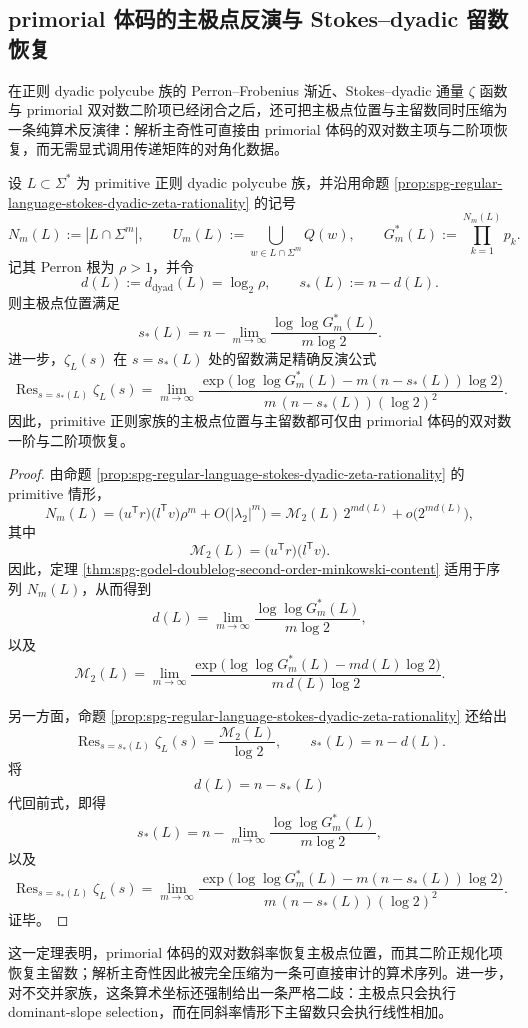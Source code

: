 \subsection{primorial 体码的主极点反演与 Stokes--dyadic 留数恢复}\label{subsec:conclusion-primorial-bodycode-pole-residue-inversion}
在正则 dyadic polycube 族的 Perron--Frobenius 渐近、Stokes--dyadic 通量 \(\zeta\) 函数与 primorial 双对数二阶项已经闭合之后，还可把主极点位置与主留数同时压缩为一条纯算术反演律：解析主奇性可直接由 primorial 体码的双对数主项与二阶项恢复，而无需显式调用传递矩阵的对角化数据。

\begin{theorem}\label{thm:conclusion-primorial-bodycode-pole-residue-inversion}
设 \(L\subset \Sigma^\ast\) 为 primitive 正则 dyadic polycube 族，并沿用命题 \ref{prop:spg-regular-language-stokes-dyadic-zeta-rationality} 的记号
\[
N_m(L):=|L\cap \Sigma^m|,
\qquad
U_m(L):=\bigcup_{w\in L\cap \Sigma^m}Q(w),
\qquad
G_m^\ast(L):=\prod_{k=1}^{N_m(L)}p_k.
\]
记其 Perron 根为 \(\rho>1\)，并令
\[
d(L):=d_{\mathrm{dyad}}(L)=\log_2\rho,
\qquad
s_\ast(L):=n-d(L).
\]
则主极点位置满足
\[
s_\ast(L)
=
n-\lim_{m\to\infty}\frac{\log\log G_m^\ast(L)}{m\log 2}.
\]
进一步，\(\zeta_L(s)\) 在 \(s=s_\ast(L)\) 处的留数满足精确反演公式
\[
\operatorname{Res}_{s=s_\ast(L)}\zeta_L(s)
=
\lim_{m\to\infty}
\frac{
\exp\!\bigl(\log\log G_m^\ast(L)-m(n-s_\ast(L))\log 2\bigr)
}
{m\,(n-s_\ast(L))(\log 2)^2}.
\]
因此，primitive 正则家族的主极点位置与主留数都可仅由 primorial 体码的双对数一阶与二阶项恢复。
\end{theorem}
\begin{proof}
由命题 \ref{prop:spg-regular-language-stokes-dyadic-zeta-rationality} 的 primitive 情形，
\[
N_m(L)
=
\bigl(u^{\mathsf T}r\bigr)\bigl(l^{\mathsf T}v\bigr)\rho^m
+O\!\bigl(|\lambda_2|^m\bigr)
=
\mathcal M_2(L)\,2^{m d(L)}+o\!\bigl(2^{m d(L)}\bigr),
\]
其中
\[
\mathcal M_2(L)=\bigl(u^{\mathsf T}r\bigr)\bigl(l^{\mathsf T}v\bigr).
\]
因此，定理 \ref{thm:spg-godel-doublelog-second-order-minkowski-content} 适用于序列 \(N_m(L)\)，从而得到
\[
d(L)=\lim_{m\to\infty}\frac{\log\log G_m^\ast(L)}{m\log 2},
\]
以及
\[
\mathcal M_2(L)
=
\lim_{m\to\infty}
\frac{
\exp\!\bigl(\log\log G_m^\ast(L)-m d(L)\log 2\bigr)
}
{m\,d(L)\log 2}.
\]

另一方面，命题 \ref{prop:spg-regular-language-stokes-dyadic-zeta-rationality} 还给出
\[
\operatorname{Res}_{s=s_\ast(L)}\zeta_L(s)=\frac{\mathcal M_2(L)}{\log 2},
\qquad
s_\ast(L)=n-d(L).
\]
将
\[
d(L)=n-s_\ast(L)
\]
代回前式，即得
\[
s_\ast(L)
=
n-\lim_{m\to\infty}\frac{\log\log G_m^\ast(L)}{m\log 2},
\]
以及
\[
\operatorname{Res}_{s=s_\ast(L)}\zeta_L(s)
=
\lim_{m\to\infty}
\frac{
\exp\!\bigl(\log\log G_m^\ast(L)-m(n-s_\ast(L))\log 2\bigr)
}
{m\,(n-s_\ast(L))(\log 2)^2}.
\]
证毕。
\end{proof}

\noindent
这一定理表明，primorial 体码的双对数斜率恢复主极点位置，而其二阶正规化项恢复主留数；解析主奇性因此被完全压缩为一条可直接审计的算术序列。进一步，对不交并家族，这条算术坐标还强制给出一条严格二歧：主极点只会执行 dominant-slope selection，而在同斜率情形下主留数只会执行线性相加。



\endinput
